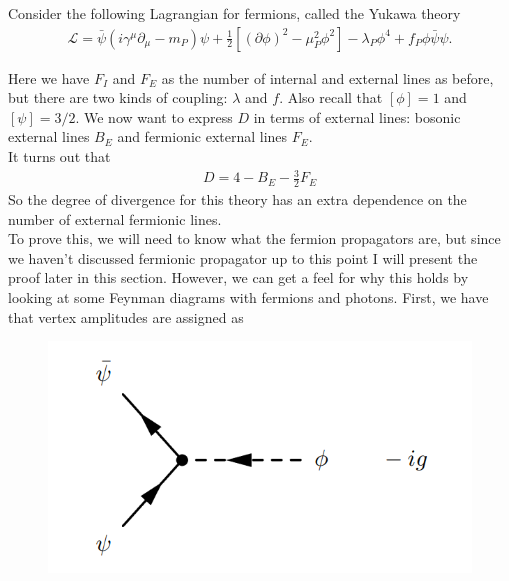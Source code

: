 \documentclass{book}
\theoremstyle{definition}
\newcommand{\p}{\partial}
\newcommand{\lag}{\mathcal{L}}
\newcommand{\f}[2]{\frac{#1}{#2}}
\begin{document}
Consider the following Lagrangian for fermions, called the Yukawa theory
\begin{align}
\lag = \bar{\psi}(i\gamma^\mu \p_\mu - m_P)\psi + \f{1}{2}[(\p \phi)^2 - \mu^2_P \phi^2] - \lambda_P \phi^4 + f_P \phi \bar{\psi}\psi.
\end{align}


Here we have $F_I$ and $F_E$ as the number of internal and external lines as before, but there are two kinds of coupling: $\lambda$ and $f$. Also recall that $[\phi] = 1$ and $[\psi] = 3/2$. We now want to express $D$ in terms of external lines: bosonic external lines $B_E$ and fermionic external lines $F_E$. \\


It turns out that 
\begin{align}
\boxed{D = 4 - B_E - \f{3}{2}F_E}
\end{align}
So the degree of divergence for this theory has an extra dependence on the number of external fermionic lines. \\

To prove this, we will need to know what the fermion propagators are, but since we haven't discussed fermionic propagator up to this point I will present the proof later in this section. However, we can get a feel for why this holds by looking at some Feynman diagrams with fermions and photons. First, we have that vertex amplitudes are assigned as 
\begin{figure}[!htb]
	\centering
	\includegraphics[scale=0.4]{fermi}
\end{figure}\\
\end{document}
